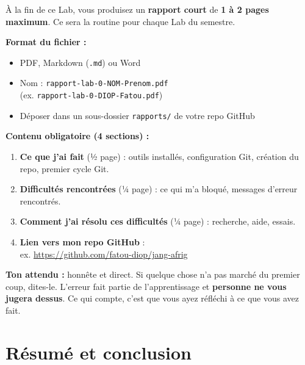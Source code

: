 \documentclass[11pt,a4paper]{article}
\begin{document}
\begin{attentionbox}
À la fin de ce Lab, vous produisez un \textbf{rapport court} de
\textbf{1 à 2 pages maximum}. Ce sera la routine pour chaque Lab du semestre.

\medskip

\textbf{Format du fichier :}
\begin{itemize}[nosep]
    \item PDF, Markdown (\texttt{.md}) ou Word
    \item Nom : \texttt{rapport-lab-0-NOM-Prenom.pdf}\\
          (ex. \texttt{rapport-lab-0-DIOP-Fatou.pdf})
    \item Déposer dans un sous-dossier \texttt{rapports/} de votre repo GitHub
\end{itemize}

\medskip

\textbf{Contenu obligatoire (4 sections) :}

\begin{enumerate}[nosep]
    \item \textbf{Ce que j'ai fait} (½ page) : outils installés, configuration Git, création du repo, premier cycle Git.
    \item \textbf{Difficultés rencontrées} (¼ page) : ce qui m'a bloqué, messages d'erreur rencontrés.
    \item \textbf{Comment j'ai résolu ces difficultés} (¼ page) : recherche, aide, essais.
    \item \textbf{Lien vers mon repo GitHub} : \\
          ex. \url{https://github.com/fatou-diop/jang-afrig}
\end{enumerate}

\medskip

\textbf{Ton attendu :} honnête et direct. Si quelque chose n'a pas marché
du premier coup, dites-le. L'erreur fait partie de l'apprentissage et
\textbf{personne ne vous jugera dessus}. Ce qui compte, c'est que vous
ayez réfléchi à ce que vous avez fait.
\end{attentionbox}

\section{Résumé et conclusion}
\end{document}
